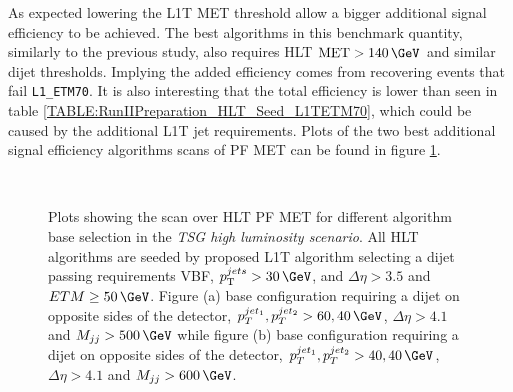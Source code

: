 As expected lowering the \gls{L1T} \gls{MET} threshold allow a bigger additional signal efficiency to be achieved. The best algorithms in this benchmark quantity, similarly to the previous study, also requires \gls{HLT} $\text{MET}>140\,\GeV$  and similar dijet thresholds. Implying the added efficiency comes from recovering events that fail \verb|L1_ETM70|. It is also interesting that the total efficiency is lower than seen in table \ref{TABLE:RunIIPreparation_HLT_Seed_L1TETM70}, which could be caused by the additional \gls{L1T} jet requirements. Plots of the two best additional signal efficiency algorithms scans of \gls{PF} \gls{MET} can be found in figure \ref{FIGURE:RunIIPreparation_HLT_Seed_L1TDijetMET}.

\begin{figure}[!htp]%
\qquad
{}\\
\caption{Plots showing the scan over \gls{HLT} \gls{PF} \gls{MET} for different algorithm base selection in the \textit{\gls{TSG} high luminosity scenario}. All \gls{HLT} algorithms are seeded by proposed \gls{L1T} algorithm selecting a dijet passing requirements \gls{VBF}, $\pt^{jets}>30\,\GeV$, and $\Delta\eta>3.5$ and $ETM \geq 50\,\GeV$. Figure (a) base configuration requiring a dijet on opposite sides of the detector, $p_T^{jet_1},p_T^{jet_2}>60,40\,\GeV$, $\Delta\eta>4.1$ and $M_{jj}>500\,\GeV$ while figure (b) base configuration requiring a dijet on opposite sides of the detector, $p_T^{jet_1},p_T^{jet_2}>40,40\,\GeV$, $\Delta\eta>4.1$ and $M_{jj}>600\,\GeV$.}
\label{FIGURE:RunIIPreparation_HLT_Seed_L1TDijetMET}
\end{figure}

